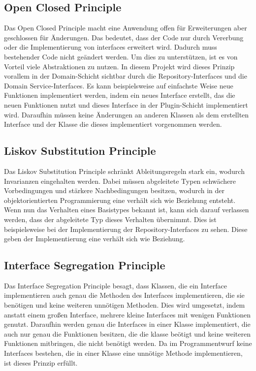 \subsection{Open Closed Principle}
Das Open Closed Principle macht eine Anwendung offen für Erweiterungen aber geschlossen für Änderungen. Das bedeutet, dass der Code nur durch Vererbung oder die Implementierung von interfaces erweitert wird. Dadurch muss bestehender Code nicht geändert werden. Um dies zu unterstützen, ist es von Vorteil viele Abstraktionen zu nutzen.
\newline In diesem Projekt wird dieses Prinzip vorallem in der Domain-Schicht sichtbar durch die Repository-Interfaces und die Domain Service-Interfaces. Es kann beispielsweise auf einfachste Weise neue Funktionen implementiert werden, indem ein neues Interface erstellt, das die neuen Funktionen nutzt und dieses Interface in der Plugin-Schicht implementiert wird. Daraufhin 
müssen keine Änderungen an anderen Klassen als dem erstellten Interface und der Klasse die dieses implementiert vorgenommen werden. 
\subsection{Liskov Substitution Principle}
Das Liskov Substitution Principle schränkt Ableitungsregeln stark ein, wodurch Invarianzen eingehalten werden. Dabei müssen abgeleitete Typen schwächere Vorbedingungen und stärkere Nachbedingungen besitzen, wodurch in der 
objektorientierten Programmierung eine \glqq verhält sich wie \grqq Beziehung entsteht. Wenn nun das Verhalten eines Basistypes bekannt ist, kann sich darauf verlassen werden, dass der abgeleitete Typ dieses Verhalten übernimmt.
\newline Dies ist beispielsweise bei der Implementierung der Repository-Interfaces zu sehen. Diese geben der Implementierung eine \glqq verhält sich wie \grqq Beziehung.
\subsection{Interface Segregation Principle}
Das Interface Segregation Principle besagt, dass Klassen, die ein Interface implementieren auch genau die Methoden des Interfaces implementieren, die sie benötigen und keine weiteren unnötigen Methoden. Dies wird umgesetzt, indem anstatt einem großen Interface, mehrere kleine Interfaces mit wenigen Funktionen genutzt.
Daraufhin werden genau die Interfaces in einer Klasse implementiert, die auch nur genau die Funktionen besitzen, die die klasse beötigt und keine weiteren Funktionen mitbringen, die nicht benötigt werden. 
\newline Da im Programmentwurf keine Interfaces bestehen, die in einer Klasse eine unnötige Methode implementieren, ist dieses Prinzip erfüllt.
